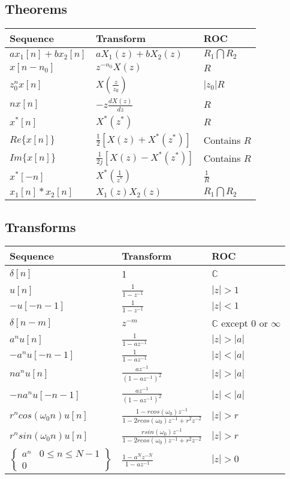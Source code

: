 \documentclass{article}
\begin{document}
\subsection*{Theorems}
\begin{center}
    \begin{tabularx}{\textwidth}{XXX}
        \hline
        Sequence & Transform & ROC\\
        \hline
        $ax_1[n]+bx_2[n]$ & $aX_1(z)+bX_2(z)$ & $R_1 \bigcap R_2$\\
        $x[n-n_0]$ & $z^{-n_0}X(z)$ & $R$\\
        $z_0^nx[n]$ & $X(\frac{z}{z_0})$ & $|z_0|R$\\
        $nx[n]$ & $-z\frac{dX(z)}{dz}$ & $R$\\
        $x^*[n]$ & $X^*(z^*)$ & $R$\\
        $Re\{x[n]\}$ & $\frac{1}{2}\left[X(z)+X^*(z^*)\right]$ & Contains $R$\\
        $Im\{x[n]\}$ & $\frac{1}{2j}\left[X(z)-X^*(z^*)\right]$ & Contains $R$\\
        $x^*[-n]$ & $X^*\left(\frac{1}{z^*}\right)$ & $\frac{1}{R}$\\
        $x_1[n]*x_2[n]$ & $X_1(z)X_2(z)$ & $R_1 \bigcap R_2$
    \end{tabularx}
\end{center}
\subsection*{Transforms}
\begin{center}
    \begin{tabularx}{\textwidth}{XXX}
        \hline
        Sequence & Transform & ROC\\
        \hline
        $\delta[n]$ & 1 & $\mathbb{C}$\\
        $u[n]$ & $\frac{1}{1-z^{-1}}$ & $|z|>1$\\
        $-u[-n-1]$ & $\frac{1}{1-z^{-1}}$ & $|z|<1$\\
        $\delta[n-m]$ & $z^{-m}$ & $\mathbb{C}$ except 0 or $\infty$ \\
        $a^nu[n]$ & $\frac{1}{1-az^{-1}}$ & $|z|>|a|$\\
        $-a^nu[-n-1]$ & $\frac{1}{1-az^{-1}}$ & $|z|<|a|$\\
        $na^nu[n]$ & $\frac{az^{-1}}{(1-az^{-1})^2}$ & $|z|>|a|$\\
        $-na^nu[-n-1]$ & $\frac{az^{-1}}{(1-az^{-1})^2}$ & $|z|<|a|$\\
        $r^ncos(\omega_0 n)u[n]$ & $\frac{1-rcos(\omega_0)z^{-1}}{1-2rcos(\omega_0)z^{-1}+r^2z^{-2}}$ & $|z|>r$\\
        $r^nsin(\omega_0 n)u[n]$ & $\frac{rsin(\omega_0)z^{-1}}{1-2rcos(\omega_0)z^{-1}+r^2z^{-2}}$ & $|z|>r$\\
        $\left\{\begin{array}{cc}
            a^n & 0\le n\le N-1\\
            0
        \end{array}\right\}$ & $\frac{1-a^Nz^{-N}}{1-az^{-1}}$ & $|z|>0$
    \end{tabularx}
\end{center}
\end{document}
